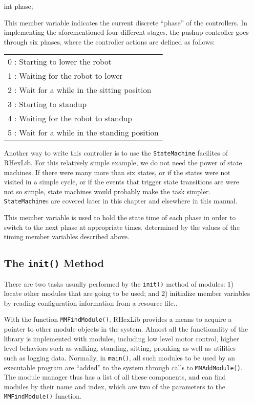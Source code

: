 \begin{codesegment}
  int phase;
\end{codesegment}

This member variable indicates the current discrete ``phase'' of the
controllers. In implementing the aforementioned four different stages, the
pushup controller goes through six phases, where the controller actions are
defined as follows:

\begin{center}
\begin{tabular}{l}
0 : Starting to lower the robot \\
1 : Waiting for the robot to lower \\
2 : Wait for a while in the sitting position \\
3 : Starting to standup \\
4 : Waiting for the robot to standup \\
5 : Wait for a while in the standing position
\end{tabular}
\end{center}

Another way to write this controller is to use the {\tt StateMachine}
facilites of RHexLib. For this relatively simple example, we do not need the
power of state machines. If there were many more than six states, or if the
states were not visited in a simple cycle, or if the events that trigger
state transitions are were not so simple, state machines would probably make
the task simpler. {\tt StateMachine}s are covered later in this chapter and
elsewhere in this manual.

\begin{codesegment}
  double mark;
};
\end{codesegment}

This member variable is used to hold the state time of each phase in order
to switch to the next phase at appropriate times, determined by the values
of the timing member variables described above.

\subsection{The {\tt init()} Method}

There are two tasks usually performed by the {\tt init()} method of modules:
1) locate other modules that are going to be used; and 2) initialize member
variables by reading configuration information from a resource file..

With the function {\tt MMFindModule()}, RHexLib provides a means to acquire
a pointer to other module objects in the system. Almost all the
functionality of the library is implemented with modules, including low
level motor control, higher level behaviors such as walking, standing,
sitting, pronking as well as utilities such as logging data. Normally, in
{\tt main()}, all such modules to be used by an executable program are
``added'' to the system through calls to {\tt MMAddModule()}. The module
manager thus has a list of all these components, and can find modules by
their name and index, which are two of the parameters to the {\tt
MMFindModule()} function.

